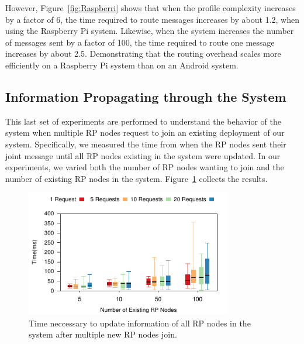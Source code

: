 However, Figure~\ref{fig:Raspberri} shows that when the profile complexity increases by a factor of 6, the time required to route messages increases by about 1.2, when using the Raspberry Pi system. Likewise, when the system increases the number of messages sent by a factor of 100, the time required to route one message increases by about 2.5. Demonstrating that the routing overhead scales more efficiently on a Raspberry Pi system than on an Android system.
\vspace{1ex}




\subsection{Information Propagating through the System}

This last set of experiments are performed to understand the behavior of the system when multiple RP nodes request to join an existing deployment of our system. Specifically, we measured the time from when the RP nodes sent their joint message until all RP nodes existing in the system were updated. In our experiments, we varied both the number of RP nodes wanting to join and the number of existing RP nodes in the system. Figure~\ref{fig:rpDiscovery} collects the results.

\begin{figure}[htb!]
  \centering
    \includegraphics[width=0.8\textwidth]{Figures/rpDiscoveryBox.pdf}
  \caption{Time neccessary to update information of all RP nodes in the system after multiple new RP nodes join.} \label{fig:rpDiscovery}
\end{figure}

